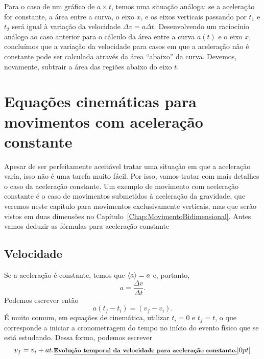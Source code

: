 Para o caso de um gráfico de $a \times t$, temos uma situação análoga: se a aceleração for constante, a área entre a curva, o eixo $x$, e os eixos verticais passando por $t_1$ e $t_2$ será igual à variação da velocidade $\Delta v = a \Delta t$. Desenvolvendo um raciocínio análogo ao caso anterior para o cálculo da área entre a curva $a(t)$ e o eixo $x$, concluímos que a variação da velocidade para casos em que a aceleração não é constante pode ser calculada através da área ``abaixo'' da curva. Devemos, novamente, subtrair a área das regiões abaixo do eixo $t$.

\section{Equações cinemáticas para movimentos com aceleração constante}
Apesar de ser perfeitamente aceitável tratar uma situação em que a aceleração varia, isso não é uma tarefa muito fácil. Por isso, vamos tratar com mais detalhes o caso da aceleração constante. Um exemplo de movimento com aceleração constante é o caso de movimentos submetidos à aceleração da gravidade, que veremos neste capítulo para movimentos exclusivamente verticais, mas que serão vistos em duas dimensões no Capítulo~\ref{Chap:MovimentoBidimensional}. Antes vamos deduzir as fórmulas para aceleração constante


\subsection{Velocidade}

Se a aceleração é constante, temos que $\left\langle{a}\right\rangle = a$ e, portanto,
\begin{equation}
  a = \frac{\Delta v}{\Delta t}.
\end{equation}
%
Podemos escrever então
\begin{equation}
  a (t_f - t_i) = (v_f - v_i).
\end{equation}
%
É muito comum, em equações de cinemática, utilizar $t_i = 0$ e $t_f = t$, o que corresponde a iniciar a cronometragem do tempo no início do evento físico que se está estudando. Dessa forma, podemos escrever
\begin{equation}\label{Eq:VV0AT}
  v_f = v_i + at.\relax{\footnotesize\emph{\textbf{Evolução temporal da velocidade para aceleração constante.}}}[0pt]
\end{equation}

